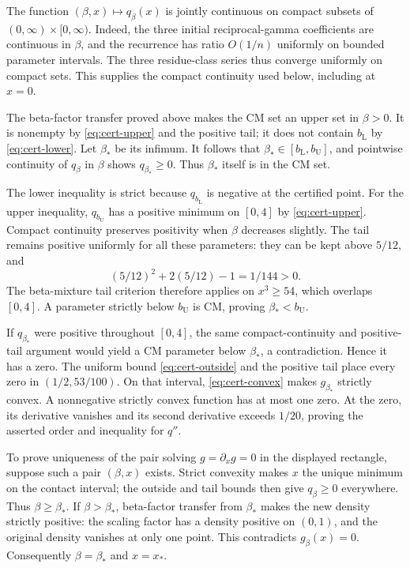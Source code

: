 \documentclass[11pt,a4paper]{article}
\numberwithin{equation}{section}
\theoremstyle{definition}\newtheorem{definition}[theorem]{Definition}
\theoremstyle{remark}\newtheorem{remark}[theorem]{Remark}
\newcommand{\bL}{b_{\mathrm L}}
\newcommand{\bU}{b_{\mathrm U}}
\begin{document}
The function \((\beta,x)\mapsto q_\beta(x)\) is jointly continuous
on compact subsets of \((0,\infty)\times[0,\infty)\). Indeed, the
three initial reciprocal-gamma coefficients are continuous in
\(\beta\), and the recurrence has ratio \(O(1/n)\) uniformly on
bounded parameter intervals. The three residue-class series thus
converge uniformly on compact sets. This supplies the compact
continuity used below, including at \(x=0\).

The beta-factor transfer proved above makes the CM set an upper set in
\(\beta>0\). It is nonempty by \eqref{eq:cert-upper} and the
positive tail; it does not contain \(\bL\) by
\eqref{eq:cert-lower}. Let \(\beta_*\) be its infimum. It follows
that \(\beta_*\in[\bL,\bU]\), and pointwise continuity of
\(q_\beta\) in \(\beta\) shows \(q_{\beta_*}\ge0\).
Thus \(\beta_*\) itself is in the CM set.

The lower inequality is strict because \(q_{\bL}\) is negative at
the certified point. For the upper inequality, \(q_{\bU}\) has a
positive minimum on \([0,4]\) by \eqref{eq:cert-upper}. Compact
continuity preserves positivity when \(\beta\) decreases slightly.
The tail remains positive uniformly for all these parameters: they
can be kept above \(5/12\), and
\[
 (5/12)^2+2(5/12)-1=1/144>0.
\]
The beta-mixture tail criterion therefore applies on \(x^3\ge54\),
which overlaps \([0,4]\). A parameter strictly below \(\bU\)
is CM, proving \(\beta_*<\bU\).

If \(q_{\beta_*}\) were positive throughout \([0,4]\), the same
compact-continuity and positive-tail argument would yield a CM
parameter below \(\beta_*\), a contradiction. Hence it has a zero.
The uniform bound \eqref{eq:cert-outside} and the positive tail place
every zero in \((1/2,53/100)\). On that interval,
\eqref{eq:cert-convex} makes \(g_{\beta_*}\) strictly convex. A
nonnegative strictly convex function has at most one zero. At the
zero, its derivative vanishes and its second derivative exceeds
\(1/20\), proving the asserted order and inequality for \(q''\).

To prove uniqueness of the pair solving \(g=\partial_xg=0\) in
the displayed rectangle, suppose such a pair \((\beta,x)\) exists.
Strict convexity makes \(x\) the unique minimum on the contact
interval; the outside and tail bounds then give \(q_\beta\ge0\)
everywhere. Thus \(\beta\ge\beta_*\). If \(\beta>\beta_*\),
beta-factor transfer from \(\beta_*\) makes the new density strictly
positive: the scaling factor has a density positive on \((0,1)\),
and the original density vanishes at only one point. This contradicts
\(g_\beta(x)=0\). Consequently \(\beta=\beta_*\) and
\(x=x_*\).
\end{document}
